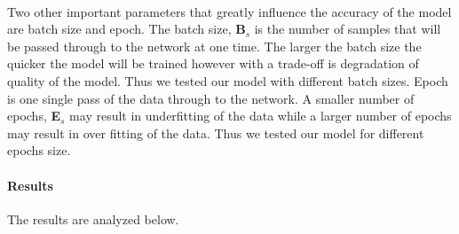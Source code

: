 \paragraph{} Two other important parameters that greatly influence the accuracy of the model are batch size and epoch. The batch size, \textbf{B$_{s}$} is the number of samples that will be passed through to the network at one time. The larger the batch size the quicker the model will be trained however with a trade-off is degradation of quality of the model. Thus we tested our model with different batch sizes. Epoch is one single pass of the data through to the network. A smaller number of epochs, \textbf{E$_{s}$} may result in underfitting of the data while a larger number of epochs may result in over fitting of the data. Thus we tested our model for different epochs size.

\paragraph{Results} The results are analyzed below.
\begin{center}
\label{tab:shortlist_movies}
\end{center}
